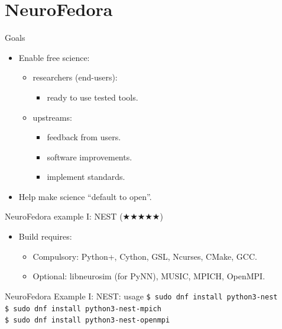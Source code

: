 \section{NeuroFedora}
\begin{frame}[c]{Goals}
  \begin{itemize}
    \item Enable \alert{free science}:
      \pause{}
      \begin{itemize}
        \item researchers (end-users):
          \begin{itemize}
            \item ready to use \alert{tested} tools.
          \end{itemize}
          \pause{}
        \item upstreams:
          \begin{itemize}
            \item feedback from users.
            \item software improvements.
            \item implement standards.
          \end{itemize}
      \end{itemize}
      \pause{}
    \item Help make science \alert{\enquote{default to open}}.
  \end{itemize}
\end{frame}
\begin{frame}[c]{NeuroFedora example I\@: NEST (\(\bigstar\bigstar\bigstar\bigstar\bigstar\))}
  \begin{itemize}
    \item Build requires\footnotemark:
      \begin{itemize}
        \item \alert{Compulsory:} Python+, Cython, GSL, Ncurses, CMake, GCC\@.
          \pause{}
        \item \alert{Optional:} libneurosim (for PyNN), MUSIC, MPICH, OpenMPI\@.
      \end{itemize}
  \end{itemize}
\end{frame}
\begin{frame}[c]{NeuroFedora Example I\@: NEST\@: usage}
  \texttt{\$ sudo dnf install python3-nest}\\
  \texttt{\$ sudo dnf install python3-nest-mpich}\\
  \texttt{\$ sudo dnf install python3-nest-openmpi}
\end{frame}

